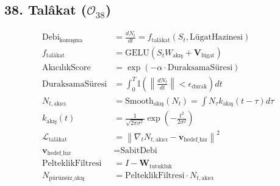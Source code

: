 \documentclass[11pt, a4paper]{article}
\begin{document}
\subsection{38. Talâkat ($\mathcal{O}_{38}$)}
\begin{align}
\text{Debi}_{\text{konuşma}} &= \frac{d N_t}{d t} = f_{\text{talâkat}}(S_t, \text{LügatHazinesi}) \\
f_{\text{talâkat}} &= \text{GELU}(S_t W_{\text{akış}} + \mathbf{V}_{\text{lügat}}) \\
\text{AkıcılıkScore} &= \exp\left( -\alpha \cdot \text{DuraksamaSüresi} \right) \\
\text{DuraksamaSüresi} &= \int_0^T \mathbb{I}\left( \left\|\frac{d N_t}{d t}\right\| < \epsilon_{\text{durak}} \right) dt \\
N_{t, \text{akıcı}} &= \text{Smooth}_{\text{akış}}(N_t) = \int N_\tau k_{\text{akış}}(t-\tau) d\tau \\
k_{\text{akış}}(t) &= \frac{1}{\sqrt{2\pi \sigma^2}} \exp\left( -\frac{t^2}{2\sigma^2} \right) \\
\mathcal{L}_{\text{talâkat}} &= \left\| \nabla_t N_{t, \text{akıcı}} - \mathbf{v}_{\text{hedef\_hız}} \right\|^2 \\
\mathbf{v}_{\text{hedef\_hız}} &= \text{SabitDebi} \\
\text{PelteklikFiltresi} &= I - \mathbf{W}_{\text{tutukluk}} \\
N_{\text{pürüzsüz\_akış}} &= \text{PelteklikFiltresi} \cdot N_{t, \text{akıcı}}
\end{align}
\end{document}

